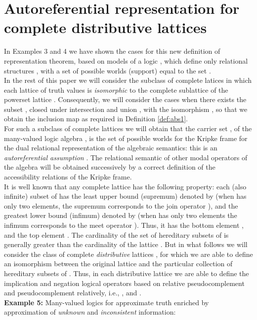 \documentclass[10pt,twocolumn]{article}
\begin{document}
\section{Autoreferential representation for complete distributive lattices}
In  Examples 3 and 4 we have shown  the cases for  this new
definition of representation theorem, based on models of a logic
, which define only relational structures , with a set of possible worlds (support)
equal to
the set . \\
In the rest of this paper we will consider the subclass of complete
latices in which each lattice of truth values   is \emph{isomorphic} to the complete sublattice of
the powerset lattice .
Consequently, we will consider the cases when there exists the
subset , closed under intersection
 and union , with the isomorphism , so that we obtain the inclusion map  as required in Definition \ref{def:abs1}.\\
For such a subclass of complete lattices we will obtain that the
carrier set , of the many-valued logic algebra , is
the set of possible worlds for the Kripke frame for the  dual
relational representation of the algebraic semantics: this is an
\emph{autoreferential assumption} \cite{Majk06ml}. The relational
semantic of other modal operators
of the algebra  will be obtained successively
by  a correct definition of the accessibility relations of the
Kripke frame.\\
It is well known that any complete lattice  has the following
property: each (also infinite) subset  of  has the least upper
bound (supremum) denoted by  (when  has only two
elements, the supremum corresponds to the join operator ), and
the greatest lower bound (infimum) denoted by  (when
 has only two elements  the infimum corresponds to the meet
operator ). Thus, it has the bottom element , and the top element . The cardinality
of the set of hereditary subsets of  is generally greater than
the cardinality of the lattice . But in what follows we will
consider the class of complete \emph{distributive} lattices , for
which we are able to define an isomorphism \cite{Birkh40} between
the original lattice  and the particular collection  of
hereditary subsets of . Thus, in each  distributive lattice we
are able to define the implication and negation logical operators
based on relative pseudocomplement and pseudocomplement relatively,
i.e., ,   and  . \\
 \textbf{Example 5:} Many-valued logics for approximate truth enriched by approximation of \emph{unknown} and \emph{inconsistent} information:
\end{document}
